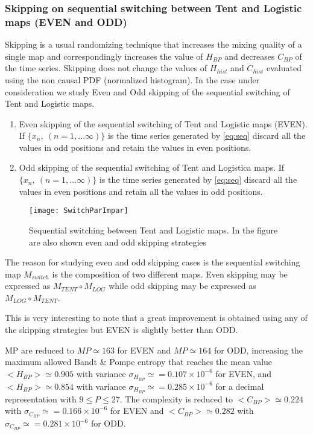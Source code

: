 \subsubsection{Skipping on sequential switching between Tent and Logistic maps (EVEN and ODD)} \label{sssec:switch}

Skipping is a usual randomizing technique that increases the mixing quality of a single map and correspondingly increases the value of $H_{BP}$ and decreases $C_{BP} $ of the time series. Skipping does not change the values of $H_{hist}$ and $C_{hist}$ evaluated using the non causal PDF (normalized histogram)\cite{DeMicco2008}. In the case under consideration we study Even and Odd skipping of the sequential switching of Tent and Logistic maps.


\begin{enumerate}
	\item Even skipping of the sequential switching of Tent and Logistic maps (EVEN).\\
	If $\{x_n,~(n=1,...\infty)\}$ is the time series generated by \ref{eq:seq} discard all the values in odd positions and retain the values in even positions.
	\item Odd skipping of the sequential switching of Tent and Logistica maps.
	If $\{x_n,~(n=1,...\infty)\}$ is the time series generated by \ref{eq:seq} discard all the values in even positions and retain all the values in odd positions.
\end{enumerate}

\begin{figure}
	\texttt{[image: SwitchParImpar]}
	\caption{Sequential switching between Tent and Logistic maps. In the figure are also shown even and odd skipping strategies} \label{fig:seq}
\end{figure}

The reason for studying even and odd skipping cases is the sequential switching map $M_{switch}$ is the composition of two different maps. Even skipping may be expressed as $M_{TENT}\circ M_{LOG}$ while odd skipping may be expressed as $M_{LOG}\circ M_{TENT}$.

This is very interesting to note that a great improvement is obtained using any of the skipping strategies but EVEN is slightly better than ODD.  

MP are reduced to $MP\simeq 163$ for EVEN and $MP\simeq 164$ for ODD, increasing the maximum allowed Bandt \& Pompe entropy that reaches the mean value $<H_{BP}>\simeq 0.905$ with variance $\sigma_{H_{BP}}\simeq=0.107 \times 10^{-6}$ for EVEN, and $<H_{BP}>\simeq 0.854$ with variance $\sigma_{H_{BP}}\simeq=0.285 \times 10^{-6}$ for a decimal representation with  $9\leq P\leq27$. The complexity is reduced to $<C_{BP}>\simeq 0.224$ with $\sigma_{C_{BP}}\simeq=0.166 \times 10^{-6}$ for EVEN and  $<C_{BP}>\simeq 0.282$ with $\sigma_{C_{BP}}\simeq=0.281 \times 10^{-6}$ for ODD.

